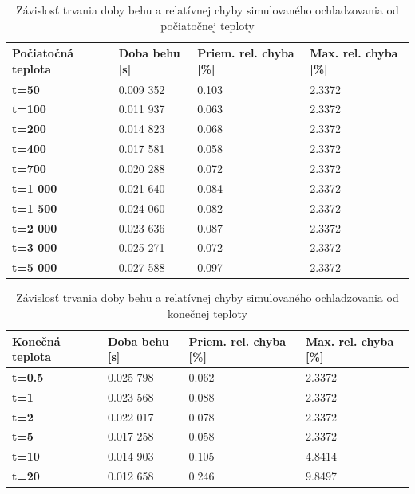 \documentclass[slovak]{article}
\begin{document}
\begin{table}[htb!]\centering
	\begin{tabularx}{\textwidth}{ | X | X | X | X |}
	  \hline                       
		\textbf{Počiatočná teplota}	& \textbf{Doba behu [s]} 	& \textbf{Priem. rel. chyba [\%]} 	& \textbf{Max. rel. chyba [\%]} 	\\ \hline
		\textbf{t=50}	&	0.009 352	&	0.103	&	2.3372	\\ \hline
		\textbf{t=100}	&	0.011 937	&	0.063 	&	2.3372	\\ \hline
		\textbf{t=200}	&	0.014 823	&	0.068	&	2.3372	\\ \hline
		\textbf{t=400}	&	0.017 581	&	0.058	&	2.3372	\\ \hline
		\textbf{t=700}	&	0.020 288	&	0.072	&	2.3372	\\ \hline
		\textbf{t=1 000}	&	0.021 640	&	0.084	&	2.3372	\\ \hline
		\textbf{t=1 500}	&	0.024 060	&	0.082	&	2.3372	\\ \hline
		\textbf{t=2 000}	&	0.023 636	&	0.087	&	2.3372	\\ \hline
		\textbf{t=3 000}	&	0.025 271	&	0.072	&	2.3372	\\ \hline
		\textbf{t=5 000}	&	0.027 588	&	0.097	&	2.3372	\\ \hline
	\end{tabularx}
\caption{Závislosť trvania doby behu a relatívnej chyby simulovaného ochladzovania od počiatočnej teploty}
\label{tab2}
\end{table}

\begin{table}[htb!]\centering
	\begin{tabularx}{\textwidth}{ | X | X | X | X |}
	  \hline                       
		\textbf{Konečná teplota}	& \textbf{Doba behu [s]} 	& \textbf{Priem. rel. chyba [\%]} 	& \textbf{Max. rel. chyba [\%]} 	\\ \hline
		\textbf{t=0.5}	&	0.025 798	&	0.062	&	2.3372	\\ \hline
		\textbf{t=1}	&	0.023 568	&	0.088 	&	2.3372	\\ \hline
		\textbf{t=2}	&	0.022 017	&	0.078	&	2.3372	\\ \hline
		\textbf{t=5}	&	0.017 258	&	0.058	&	2.3372	\\ \hline
		\textbf{t=10}	&	0.014 903	&	0.105	&	4.8414	\\ \hline
		\textbf{t=20}	&	0.012 658	&	0.246	&	9.8497	\\ \hline
	\end{tabularx}
\caption{Závislosť trvania doby behu a relatívnej chyby simulovaného ochladzovania od konečnej teploty}
\label{tab3}
\end{table}
\end{document}
